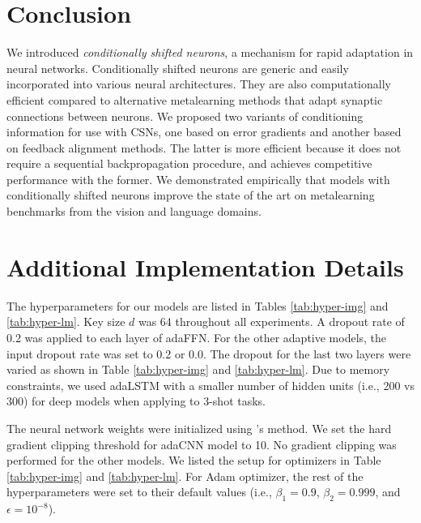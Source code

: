 \documentclass{article}
\begin{document}
\section{Conclusion}
We introduced \emph{conditionally shifted neurons}, a mechanism for rapid adaptation in neural networks. 
Conditionally shifted neurons are generic and easily incorporated into various neural architectures. They are also computationally efficient compared to alternative metalearning methods that adapt synaptic connections between neurons.
We proposed two variants of conditioning information for use with CSNs, one based on error gradients and another based on feedback alignment methods. The latter is more efficient because it does not require a sequential backpropagation procedure, and achieves competitive performance with the former.
We demonstrated empirically that models with conditionally shifted neurons improve the state of the art on metalearning benchmarks from the vision and language domains.







\clearpage

\appendix

\section{Additional Implementation Details}
\label{sec:imp_details}

The hyperparameters for our models are listed in Tables \ref{tab:hyper-img} and \ref{tab:hyper-lm}. Key size $d$ was 64 throughout all experiments. A dropout rate of 0.2 was applied to each layer of adaFFN. For the other adaptive models, the input dropout rate was set to 0.2 or 0.0. The dropout for the last two layers were varied as shown in Table \ref{tab:hyper-img} and \ref{tab:hyper-lm}. Due to memory constraints, we used adaLSTM with a smaller number of hidden units (i.e., 200 vs 300) for deep models when applying to 3-shot tasks.

The neural network weights were initialized using \citet{he2015delving}'s method. We set the hard gradient clipping threshold for adaCNN model to 10. No gradient clipping was performed for the other models. We listed the setup for optimizers in Table \ref{tab:hyper-img} and \ref{tab:hyper-lm}. For Adam optimizer, the rest of the hyperparameters were set to their default values (i.e., $\beta_1 = 0.9$, $\beta_2 = 0.999$, and $\epsilon = 10^{-8}$).
\end{document}
